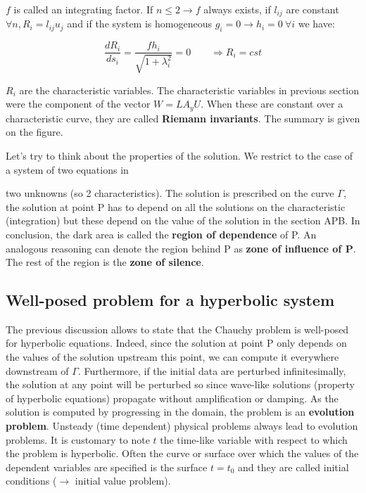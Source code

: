 $f$ is called an integrating factor. If $n\leq 2\rightarrow f$ always exists, if $l_{ij}$ are constant $\forall n, R_i = l_{ij} u_j$ and if the system is homogeneous $g_i = 0 \rightarrow h_i = 0 \ \forall i$ we have: 

\begin{equation}
\frac{d R_i}{ds_i} = \frac{f h_i}{\sqrt{1+\lambda ^2_i}} = 0 \qquad \Rightarrow R_i = cst
\end{equation}

$R_i$ are the characteristic variables. The characteristic variables in previous section were the component of the vector $W = LA_yU$. When these are constant over a characteristic curve, they are called \textbf{Riemann invariants}. The summary is given on the figure. 

Let's try to think about the properties of the solution. We restrict to the case of a system of two equations in 

two unknowns (so 2 characteristics). The solution is prescribed on the curve $\Gamma$, the solution at point P has to depend on all the solutions on the characteristic (integration) but these depend on the value of the solution in the section APB. In conclusion, the dark area is called the \textbf{region of dependence} of P. An analogous reasoning can denote the region behind P as \textbf{zone of influence of P}. The rest of the region is the \textbf{zone of silence}. 

\subsection{Well-posed problem for a hyperbolic system}
The previous discussion allows to state that the Chauchy problem is well-posed for hyperbolic equations. Indeed, since the solution at point P only depends on the values of the solution upstream this point, we can compute it everywhere downstream of $\Gamma$. Furthermore, if the initial data are perturbed infinitesimally, the solution at any point will be perturbed so since wave-like solutions (property of hyperbolic equations) propagate without amplification or damping. As the solution is computed by progressing in the domain, the problem is an \textbf{evolution problem}. Unsteady (time dependent) physical problems always lead to evolution problems. It is customary to note $t$ the time-like variable with respect to which the problem is hyperbolic. Often the curve or surface over which the values of the dependent variables are specified is the surface $t=t_0$ and they are called initial conditions ($\rightarrow$ initial value problem).\\
 
